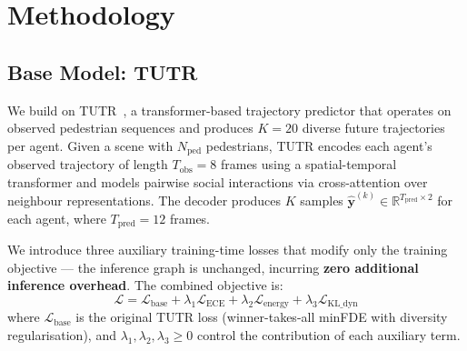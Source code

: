 \documentclass{article}
\begin{document}
%
%



\section{Methodology}
\label{sec:method}

\subsection{Base Model: TUTR}
\label{sec:method:tutr}

We build on TUTR~\cite{shi2023tutr}, a transformer-based trajectory predictor
that operates on observed pedestrian sequences and produces \(K=20\) diverse
future trajectories per agent. Given a scene with \(N_{\text{ped}}\)
pedestrians, TUTR encodes each agent's observed trajectory of length
\(T_{\text{obs}} = 8\) frames using a spatial-temporal transformer and models
pairwise social interactions via cross-attention over neighbour representations.
The decoder produces \(K\) samples
\(\hat{\mathbf{y}}^{(k)} \in \mathbb{R}^{T_{\text{pred}} \times 2}\)
for each agent, where \(T_{\text{pred}} = 12\) frames.

We introduce three auxiliary training-time losses that modify only the training
objective --- the inference graph is unchanged, incurring \textbf{zero
additional inference overhead}. The combined objective is:
%
\begin{equation}
  \mathcal{L} = \mathcal{L}_{\text{base}} +
                \lambda_1 \mathcal{L}_{\text{ECE}} +
                \lambda_2 \mathcal{L}_{\text{energy}} +
                \lambda_3 \mathcal{L}_{\text{KL\_dyn}}
  \label{eq:combined}
\end{equation}
%
where \(\mathcal{L}_{\text{base}}\) is the original TUTR loss (winner-takes-all
minFDE with diversity regularisation), and
\(\lambda_1, \lambda_2, \lambda_3 \geq 0\) control the contribution of each
auxiliary term.
\end{document}
